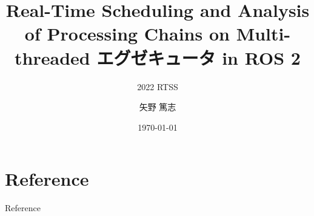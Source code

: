\newcommand{\beamerDir}[0]{/mnt/c/Users/atsushi/Documents/workspace/env/Beamer/beamer/beamer/}





\title{Real-Time Scheduling and Analysis of Processing Chains on Multi-threaded エグゼキュータ in ROS 2}
\subtitle{2022 RTSS}
\author{矢野 篤志}
\date{\today}




\maketitle

\summary





% 
% 
% 
% 
% 
% 

\lastpage

\section*{Reference}
\begin{frame}[allowframebreaks]{Reference}
    \beamertemplatetextbibitems
    
    
\end{frame}


